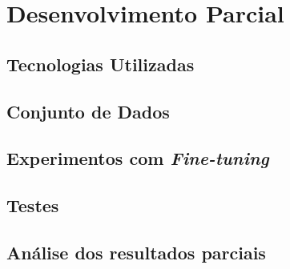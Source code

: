 \chapter{Desenvolvimento Parcial}

\section{Tecnologias Utilizadas}

\section{Conjunto de Dados}

\section{Experimentos com \textit{Fine-tuning}}

\section{Testes}

\section{Análise dos resultados parciais}

